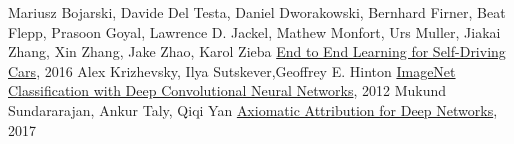 
 Mariusz Bojarski,
               Davide Del Testa,
               Daniel Dworakowski,
               Bernhard Firner,
               Beat Flepp,
               Prasoon Goyal,
               Lawrence D. Jackel,
               Mathew Monfort,
               Urs Muller,
               Jiakai Zhang,
               Xin Zhang,
               Jake Zhao,
               Karol Zieba \href{https://arxiv.org/abs/1604.07316}{End to End Learning for Self-Driving Cars}, 2016
 Alex Krizhevsky, Ilya Sutskever,Geoffrey E. Hinton  \href{https://www.cs.toronto.edu/~kriz/imagenet_classification_with_deep_convolutional.pdf}{ImageNet Classification with Deep Convolutional Neural Networks}, 2012
 Mukund Sundararajan, Ankur Taly, Qiqi Yan  \href{https://arxiv.org/abs/1703.01365}{Axiomatic Attribution for Deep Networks}, 2017
